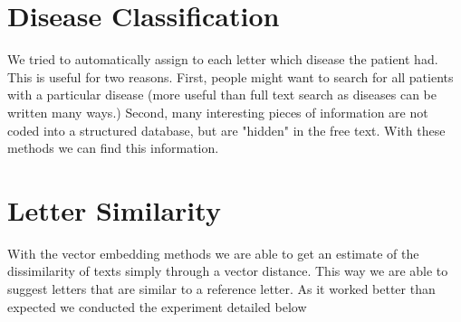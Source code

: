 \section{Disease Classification}
We tried to automatically assign to each letter which disease the patient had. This is useful for two reasons. First, people might want to search for all patients with a particular disease (more useful than full text search as diseases can be written many ways.) Second, many interesting pieces of information are not coded into a structured database, but are "hidden" in the free text. With these methods we can find this information.

\section{Letter Similarity}
With the vector embedding methods we are able to get an estimate of the dissimilarity of texts simply through a vector distance. This way we are able to suggest letters that are similar to a reference letter. As it worked better than expected we conducted the experiment detailed below


